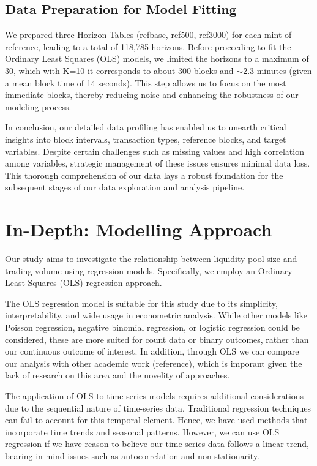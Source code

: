 \documentclass{article}
\begin{document}
\subsection{Data Preparation for Model Fitting}
We prepared three Horizon Tables (refbase, ref500, ref3000) for each mint of reference, leading to a total of 118,785 horizons. Before proceeding to fit the Ordinary Least Squares (OLS) models, we limited the horizons to a maximum of 30, which with K=10 it corresponds to about 300 blocks and $\sim$2.3 minutes (given a mean block time of 14 seconds). This step allows us to focus on the most immediate blocks, thereby reducing noise and enhancing the robustness of our modeling process.

In conclusion, our detailed data profiling has enabled us to unearth critical insights into block intervals, transaction types, reference blocks, and target variables. Despite certain challenges such as missing values and high correlation among variables, strategic management of these issues ensures minimal data loss. This thorough comprehension of our data lays a robust foundation for the subsequent stages of our data exploration and analysis pipeline.


\section{In-Depth: Modelling Approach}
Our study aims to investigate the relationship between liquidity pool size and trading volume using regression models. Specifically, we employ an Ordinary Least Squares (OLS) regression approach. 

The OLS regression model is suitable for this study due to its simplicity, interpretability, and wide usage in econometric analysis. While other models like Poisson regression, negative binomial regression, or logistic regression could be considered, these are more suited for count data or binary outcomes, rather than our continuous outcome of interest.
In addition, through OLS we can compare our analysis with other academic work (reference), which is imporant given the lack of research on this area and the novelity of approaches.

The application of OLS to time-series models requires additional considerations due to the sequential nature of time-series data. Traditional regression techniques can fail to account for this temporal element. Hence, we have used methods that incorporate time trends and seasonal patterns. However, we can use OLS regression if we have reason to believe our time-series data follows a linear trend, bearing in mind issues such as autocorrelation and non-stationarity.
\end{document}
